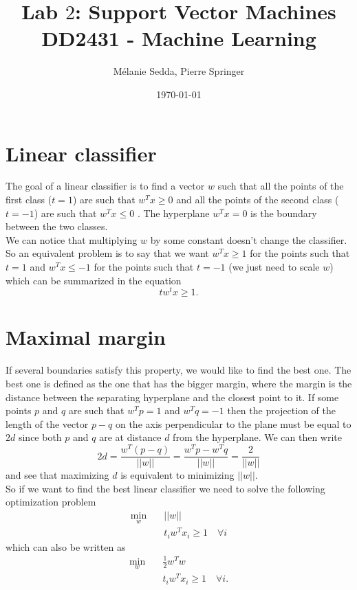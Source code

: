 \documentclass{article}
\title{Lab $2$: Support Vector Machines\\
\large{DD2431 - Machine Learning}}
\date{\today}
\author{Mélanie Sedda, Pierre Springer}
\begin{document}
\maketitle

\section{Linear classifier}
The goal of a linear classifier is to find a vector $w$ such that all the points of the first class ($t = 1$) are such that $w^Tx \geq 0$ and all the points of the second class ($t = -1$) are such that $w^Tx \leq 0$ . The hyperplane $w^Tx = 0$ is the boundary between the two classes.\\

We can notice that multiplying $w$ by some constant doesn't change the classifier. So an equivalent problem is to say that we want $w^Tx \geq 1$ for the points such that $t = 1$ and $w^Tx \leq -1$ for the points such that $t = -1$ (we just need to scale $w$) which can be summarized in the equation $$tw^tx \geq 1.$$ 

\section{Maximal margin}
If several boundaries satisfy this property, we would like to find the best one. The best one is defined as the one that has the bigger margin, where the margin is the distance between the separating hyperplane and the closest point to it. If some points $p$ and $q$ are such that $w^Tp = 1$ and $w^Tq = -1$ then the projection of the length of the vector $p-q$ on the axis perpendicular to the plane must be equal to $2d$ since both $p$ and $q$ are at distance $d$ from the hyperplane. We can then write
$$2d = \frac{w^T(p-q)}{||w||} = \frac{w^Tp-w^Tq}{||w||} = \frac{2}{||w||}$$
and see that maximizing $d$ is equivalent to minimizing $||w||$.\\

So if we want to find the best linear classifier we need to solve the following optimization problem
\begin{align*}
\min_{w}\quad &||w|| \\
&t_iw^Tx_i \geq 1 \quad \forall i
\end{align*}
which can also be written as
\begin{align}
\min_{w}\quad &\frac{1}{2} w^Tw \\
&t_iw^Tx_i \geq 1 \quad \forall i  \nonumber.
\label{primal}
\end{align}
\end{document}
